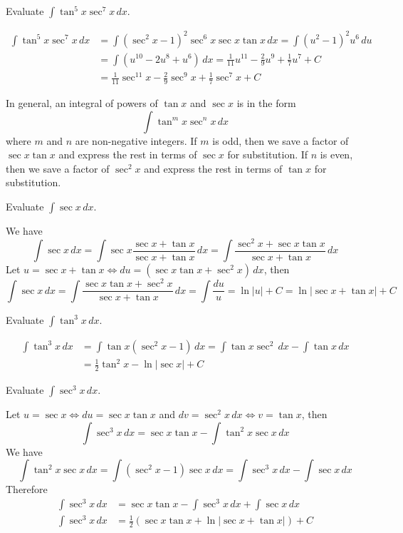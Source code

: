 \begin{problem}
    Evaluate \(\displaystyle{\int\tan^5 x\sec^7 x\,dx}\).
\end{problem}
\begin{solution}
    \begin{align*}
        \int\tan^5 x\sec^7 x\,dx
        &= \int(\sec^2 x-1)^2\sec^6 x\sec x\tan x\,dx
        =\int(u^2-1)^2u^6\,du \\
        &= \int(u^{10}-2u^8+u^6)\,dx
        =\frac{1}{11}u^{11}-\frac{2}{9}u^9+\frac{1}{7}u^7+C \\
        &= \frac{1}{11}\sec^{11}x-\frac{2}{9}\sec^9 x+\frac{1}{7}\sec^7 x
        +C
    \end{align*}
\end{solution}
In general, an integral of powers of \(\tan x\) and \(\sec x\) is in the
form
\[\int\tan^m x\sec^n x\,dx\]
where \(m\) and \(n\) are non-negative integers.
If \(m\) is odd, then we save a factor of \(\sec x\tan x\) and express the
rest in terms of \(\sec x\) for substitution.
If \(n\) is even, then we save a factor of \(\sec^2 x\) and express the
rest in terms of \(\tan x\) for substitution.
\begin{problem}
    Evaluate \(\displaystyle{\int\sec x\,dx}\).
\end{problem}
\begin{solution}
    We have
    \[\int\sec x\,dx=\int\sec x\frac{\sec x+\tan x}{\sec x+\tan x}\,dx
    =\int\frac{\sec^2 x+\sec x\tan x}{\sec x+\tan x}\,dx\]
    Let \(u=\sec x+\tan x\iff du=(\sec x\tan x+\sec^2 x)\,dx\), then
    \[\int\sec x\,dx=\int\frac{\sec x\tan x+\sec^2 x}{\sec x+\tan x}\,dx
    =\int\frac{du}{u}=\ln|u|+C=\ln|\sec x+\tan x|+C\]
\end{solution}
\begin{problem}
    Evaluate \(\displaystyle{\int\tan^3 x\,dx}\).
\end{problem}
\begin{solution}
    \begin{align*}
    \int\tan^3 x\,dx &= \int\tan x(\sec^2x-1)\,dx
    =\int\tan x\sec^2\,dx-\int\tan x\,dx \\
    &= \frac{1}{2}\tan^2 x-\ln|\sec x|+C
    \end{align*}
\end{solution}
\begin{problem}
    Evaluate \(\displaystyle{\int\sec^3 x\,dx}\).
\end{problem}
\begin{solution}
    Let \(u=\sec x\iff du=\sec x\tan x\) and \(dv=\sec^2 x\,dx\iff v=\tan x\),
    then
    \[\int\sec^3 x\,dx=\sec x\tan x-\int\tan^2 x\sec x\,dx\]
    We have
    \[\int\tan^2 x\sec x\,dx=\int(\sec^2 x-1)\sec x\,dx
    =\int\sec^3 x\,dx-\int\sec x\,dx\]
    Therefore
    \begin{align*}
        \int\sec^3 x\,dx &= \sec x\tan x-\int\sec^3 x\,dx+\int\sec x\,dx \\
        \int\sec^3 x\,dx
        &= \frac{1}{2}(\sec x\tan x+\ln|\sec x+\tan x|)+C
    \end{align*}
\end{solution}

